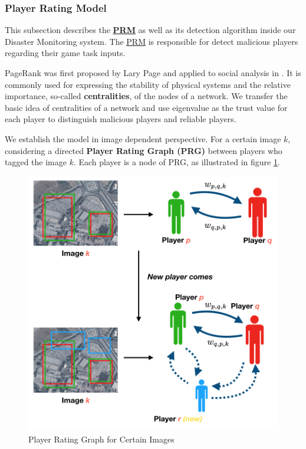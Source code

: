 \subsubsection{Player Rating Model}
\label{chapter:prm}

This subsection describes the \textbf{\hyperref[idx:prm]{PRM}} as well as its detection algorithm 
inside our Disaster Monitoring system.
The \hyperref[idx:prm]{PRM} is responsible for detect malicious players regarding their game task inputs.

PageRank was first proposed by Lary Page \cite{page1999pagerank} and 
applied to social analysis in \cite{bonacich2001eigenvector}. 
It is commonly used for expressing the stability of physical systems and the relative importance, 
so-called \textbf{centralities}, of the nodes of a network. 
We transfer the basic idea of centralities of a network
and use eigenvalue as the trust value for each player to distinguish malicious players and reliable players.

We establish the model in image dependent perspective. For a certain image $k$,
considering a directed \textbf{Player Rating Graph (PRG)\label{idx:prg}} 
between players who tagged the image $k$. Each player is a node of PRG, 
as illustrated in figure \ref{fig:graph}. 

\begin{figure}[htp]
\centering
\includegraphics[width=0.5\columnwidth]{figures/graph2}
\caption{Player Rating Graph for Certain Images}
\label{fig:graph}
\end{figure}

